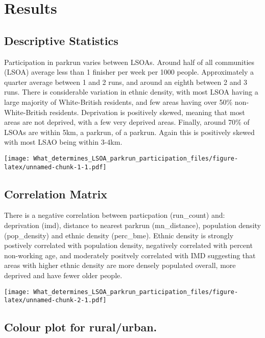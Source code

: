 \documentclass[]{article}
\begin{document}
\hypertarget{results}{%
\section{Results}\label{results}}

\hypertarget{descriptive-statistics}{%
\subsection{Descriptive Statistics}\label{descriptive-statistics}}

Participation in parkrun varies between LSOAs. Around half of all
communities (LSOA) average less than 1 finisher per week per 1000
people. Approximately a quarter average between 1 and 2 runs, and around
an eighth between 2 and 3 runs. There is considerable variation in
ethnic density, with most LSOA having a large majority of White-British
residents, and few areas having over 50\% non-White-British residents.
Deprivation is positively skewed, meaning that most areas are not
deprived, with a few very deprived areas. Finally, around 70\% of LSOAs
are within 5km, a parkrun, of a parkrun. Again this is positively skewed
with most LSAO being within 3-4km.

\texttt{[image: What\_determines\_LSOA\_parkrun\_participation\_files/figure-latex/unnamed-chunk-1-1.pdf]}

\newpage

\hypertarget{correlation-matrix}{%
\subsection{Correlation Matrix}\label{correlation-matrix}}

There is a negative correlation between particpation (run\_count) and:
deprivation (imd), distance to nearest parkrun (mn\_distance),
population density (pop\_density) and ethnic density (perc\_bme). Ethnic
density is strongly postively correlated with population density,
negatively correlated with percent non-working age, and moderately
positvely correlated with IMD suggesting that areas with higher ethnic
density are more densely populated overall, more deprived and have fewer
older people.

\texttt{[image: What\_determines\_LSOA\_parkrun\_participation\_files/figure-latex/unnamed-chunk-2-1.pdf]}
\newpage

\newpage

\hypertarget{colour-plot-for-ruralurban.}{%
\subsection{Colour plot for
rural/urban.}\label{colour-plot-for-ruralurban.}}
\end{document}
